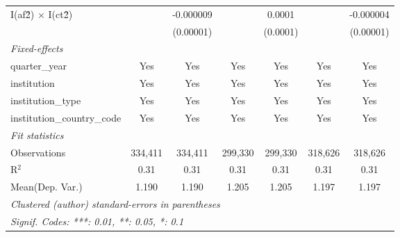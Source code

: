 \begin{tabular}{lcccccc}
   I(af\^2) $\times$ I(ct\^2)         &               & -0.000009      &               & 0.0001         &               & -0.000004\\   
                                      &               & (0.00001)      &               & (0.0001)       &               & (0.00001)\\   
   \midrule
   \emph{Fixed-effects}\\
   quarter\_year                      & Yes           & Yes            & Yes           & Yes            & Yes           & Yes\\  
   institution                        & Yes           & Yes            & Yes           & Yes            & Yes           & Yes\\  
   institution\_type                  & Yes           & Yes            & Yes           & Yes            & Yes           & Yes\\  
   institution\_country\_code         & Yes           & Yes            & Yes           & Yes            & Yes           & Yes\\  
   \midrule
   \emph{Fit statistics}\\
   Observations                       & 334,411       & 334,411        & 299,330       & 299,330        & 318,626       & 318,626\\  
   R$^2$                              & 0.31          & 0.31           & 0.31          & 0.31           & 0.31          & 0.31\\  
Mean(Dep. Var.) & 1.190 & 1.190 & 1.205 & 1.205 & 1.197 & 1.197 \\
   \midrule \midrule
   \multicolumn{7}{l}{\emph{Clustered (author) standard-errors in parentheses}}\\
   \multicolumn{7}{l}{\emph{Signif. Codes: ***: 0.01, **: 0.05, *: 0.1}}\\
\end{tabular}
\par\endgroup
